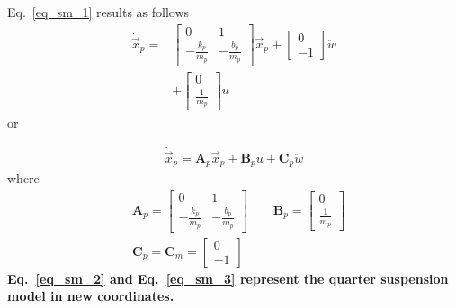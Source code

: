 \documentclass[11pt,a4paper,oneside]{book}
\numberwithin{equation}{section}
\theoremstyle{it}
\theoremstyle{definition}
\begin{document}
Eq.~\ref{eq_sm_1} results as follows
\begin{equation}
	\begin{aligned}
		\dot{\vec{x}}_p = &\begin{bmatrix} 0 & 1 \\[6pt] -\frac{k_p}{m_p} & -\frac{b_p}{m_p} \end{bmatrix}{\vec{x}}_p+\begin{bmatrix} 0 \\[6pt] -1 \end{bmatrix}\ddot{w} \\[6pt] & + \begin{bmatrix} 0 \\[6pt] \frac{1}{m_p} \end{bmatrix}u
	\end{aligned}
\end{equation} 
or
\begin{mybox}
	\begin{equation}\label{eq_sm_2}
		\begin{aligned}
			\dot{\vec{x}}_p = \mathbf{A}_p{\vec{x}}_p + \mathbf{B}_p u + \mathbf{C}_p\ddot{w} 
		\end{aligned}
	\end{equation} 
	where
	\begin{equation}\label{eq_sm_3}
		\begin{aligned}
			&\mathbf{A}_p = \begin{bmatrix} 0 & 1 \\[6pt] -\frac{k_p}{m_p} & -\frac{b_p}{m_p} \end{bmatrix}\qquad \mathbf{B}_p = \begin{bmatrix} 0 \\[6pt] \frac{1}{m_p} \end{bmatrix} \\[6pt] &\mathbf{C}_p = \mathbf{C}_m =\begin{bmatrix} 0 \\[6pt] -1 \end{bmatrix}
		\end{aligned}
	\end{equation} 
	\textbf{Eq.~\ref{eq_sm_2} and Eq.~\ref{eq_sm_3} represent the quarter suspension model in new coordinates.}
\end{mybox}
\end{document}
